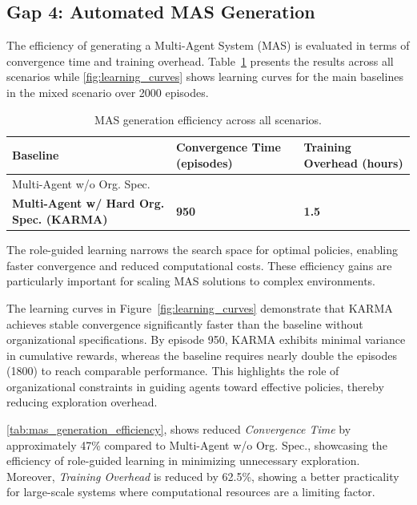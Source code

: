 \documentclass[conference]{IEEEtran}
\begin{document}
\subsection{Gap 4: Automated MAS Generation}

The efficiency of generating a Multi-Agent System (MAS) is evaluated in terms of convergence time and training overhead. Table~\ref{tab:mas_generation_efficiency} presents the results across all scenarios while \autoref{fig:learning_curves} shows learning curves for the main baselines in the mixed scenario over 2000 episodes.

\begin{table}[h]
    \centering
    \caption{MAS generation efficiency across all scenarios.}
    \label{tab:mas_generation_efficiency}
    \begin{tabular}{>{\raggedright\arraybackslash}m{3.5cm}>{\centering\arraybackslash}m{2cm}>{\centering\arraybackslash}m{2cm}}
        \hline
        \textbf{Baseline} & \textbf{Convergence Time (episodes)} & \textbf{Training Overhead (hours)} \\
        \hline
        Multi-Agent w/o Org. Spec. & 1800 & 4 \\
        \textbf{Multi-Agent w/ Hard Org. Spec. (KARMA)} & \textbf{950} & \textbf{1.5} \\
        \hline
    \end{tabular}
\end{table}

The role-guided learning narrows the search space for optimal policies, enabling faster convergence and reduced computational costs. These efficiency gains are particularly important for scaling MAS solutions to complex environments.

The learning curves in Figure~\ref{fig:learning_curves} demonstrate that KARMA achieves stable convergence significantly faster than the baseline without organizational specifications. By episode 950, KARMA exhibits minimal variance in cumulative rewards, whereas the baseline requires nearly double the episodes (1800) to reach comparable performance. This highlights the role of organizational constraints in guiding agents toward effective policies, thereby reducing exploration overhead.

\autoref{tab:mas_generation_efficiency}, shows reduced \textit{Convergence Time} by approximately 47\% compared to Multi-Agent w/o Org. Spec., showcasing the efficiency of role-guided learning in minimizing unnecessary exploration. Moreover, \textit{Training Overhead} is reduced by 62.5\%, showing a better practicality for large-scale systems where computational resources are a limiting factor.
\end{document}
